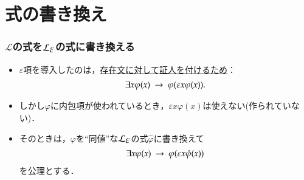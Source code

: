 \documentclass[dvipdfmx,10pt,notheorems]{beamer}
\theoremstyle{definition}
\newcommand{\lang}[1]{\mathcal{L}_{\scalebox{1.2}{$#1$}}} %
\newcommand{\rarrow}{\hspace{0.25em}\rightarrow\hspace{0.25em}} %
\begin{document}
\section{式の書き換え}
\begin{frame}\frametitle{$\mathcal{L}$の式を$\lang{\varepsilon}$の式に書き換える}
	\begin{itemize}
		\item $\varepsilon$項を導入したのは，\underline{存在文に対して証人を付けるため}：
			\begin{align}
				\exists x \varphi(x) \rarrow \varphi(\varepsilon x \varphi(x)).
			\end{align}
			
		\item しかし$\varphi$に内包項が使われているとき，$\varepsilon x \varphi(x)$は使えない(作られていない)．
		
		\item そのときは，$\varphi$を``同値''な$\lang{\varepsilon}$の式$\hat{\varphi}$に書き換えて
			\begin{align}
				\exists x \varphi(x) \rarrow \varphi(\varepsilon x \hat{\varphi}(x))
			\end{align}
			を公理とする．
	\end{itemize}
\end{frame}
\end{document}
